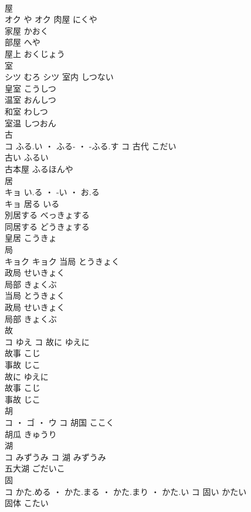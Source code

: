 \documentclass[8pt]{extreport}
\begin{document}
\begin{CJK}{UTF8}{min}
\\	屋	
\\	オク	や	オク	肉屋	にくや	
\\	家屋	かおく	
\\	部屋	へや	
\\	屋上	おくじょう	
\\	室	
\\	シツ	むろ	シツ	室内	しつない	
\\	皇室	こうしつ	
\\	温室	おんしつ	
\\	和室	わしつ	
\\	室温	しつおん	
\\	古	
\\	コ	ふる.い ・ ふる- ・ -ふる.す	コ	古代	こだい	
\\	古い	ふるい	
\\	古本屋	ふるほんや	
\\	居	
\\	キョ	い.る ・ -い ・ お.る
\\	キョ	居る	いる	
\\	別居する	べっきょする	
\\	同居する	どうきょする	
\\	皇居	こうきょ	
\\	局	
\\	キョク		キョク	当局	とうきょく	
\\	政局	せいきょく	
\\	局部	きょくぶ	
\\	当局	とうきょく	
\\	政局	せいきょく	
\\	局部	きょくぶ	
\\	故	
\\	コ	ゆえ	コ	故に	ゆえに	
\\	故事	こじ	
\\	事故	じこ	
\\	故に	ゆえに	
\\	故事	こじ	
\\	事故	じこ	
\\	胡	
\\	コ ・ ゴ ・ ウ		コ	胡国	ここく	
\\	胡瓜	きゅうり	
\\	湖	
\\	コ	みずうみ	コ	湖	みずうみ	
\\	五大湖	ごだいこ	
\\	固	
\\	コ	かた.める ・ かた.まる ・ かた.まり ・ かた.い	コ	固い	かたい	
\\	固体	こたい	

\end{CJK}
\end{document}
